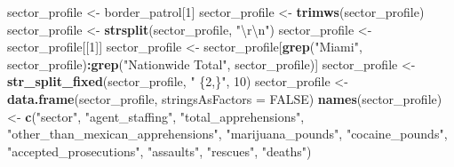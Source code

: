 \documentclass[
  12pt,
]{book}
\newenvironment{Shaded}{\begin{snugshade}}{\end{snugshade}}
\newcommand{\CharTok}[1]{\textcolor[rgb]{0.31,0.60,0.02}{#1}}
\newcommand{\DataTypeTok}[1]{\textcolor[rgb]{0.13,0.29,0.53}{#1}}
\newcommand{\DecValTok}[1]{\textcolor[rgb]{0.00,0.00,0.81}{#1}}
\newcommand{\KeywordTok}[1]{\textcolor[rgb]{0.13,0.29,0.53}{\textbf{#1}}}
\newcommand{\NormalTok}[1]{#1}
\newcommand{\OperatorTok}[1]{\textcolor[rgb]{0.81,0.36,0.00}{\textbf{#1}}}
\newcommand{\OtherTok}[1]{\textcolor[rgb]{0.56,0.35,0.01}{#1}}
\newcommand{\StringTok}[1]{\textcolor[rgb]{0.31,0.60,0.02}{#1}}
\begin{document}
\begin{Shaded}
\begin{Highlighting}[]
\NormalTok{sector\_profile <{-}}\StringTok{ }\NormalTok{border\_patrol[}\DecValTok{1}\NormalTok{]}
\NormalTok{sector\_profile <{-}}\StringTok{ }\KeywordTok{trimws}\NormalTok{(sector\_profile)}
\NormalTok{sector\_profile <{-}}\StringTok{ }\KeywordTok{strsplit}\NormalTok{(sector\_profile, }\StringTok{"}\CharTok{\textbackslash{}r\textbackslash{}n}\StringTok{"}\NormalTok{)}
\NormalTok{sector\_profile <{-}}\StringTok{ }\NormalTok{sector\_profile[[}\DecValTok{1}\NormalTok{]]}
\NormalTok{sector\_profile <{-}}\StringTok{ }\NormalTok{sector\_profile[}\KeywordTok{grep}\NormalTok{(}\StringTok{"Miami"}\NormalTok{, sector\_profile)}\OperatorTok{:}\KeywordTok{grep}\NormalTok{(}\StringTok{"Nationwide Total"}\NormalTok{, sector\_profile)]}
\NormalTok{sector\_profile <{-}}\StringTok{ }\KeywordTok{str\_split\_fixed}\NormalTok{(sector\_profile, }\StringTok{" \{2,\}"}\NormalTok{, }\DecValTok{10}\NormalTok{)}
\NormalTok{sector\_profile <{-}}\StringTok{ }\KeywordTok{data.frame}\NormalTok{(sector\_profile, }\DataTypeTok{stringsAsFactors =} \OtherTok{FALSE}\NormalTok{)}
\KeywordTok{names}\NormalTok{(sector\_profile) <{-}}\StringTok{ }\KeywordTok{c}\NormalTok{(}\StringTok{"sector"}\NormalTok{,}
                           \StringTok{"agent\_staffing"}\NormalTok{,}
                           \StringTok{"total\_apprehensions"}\NormalTok{,}
                           \StringTok{"other\_than\_mexican\_apprehensions"}\NormalTok{, }
                           \StringTok{"marijuana\_pounds"}\NormalTok{,}
                           \StringTok{"cocaine\_pounds"}\NormalTok{,}
                           \StringTok{"accepted\_prosecutions"}\NormalTok{,}
                           \StringTok{"assaults"}\NormalTok{,}
                           \StringTok{"rescues"}\NormalTok{,}
                           \StringTok{"deaths"}\NormalTok{)}
\end{Highlighting}
\end{Shaded}
\end{document}
